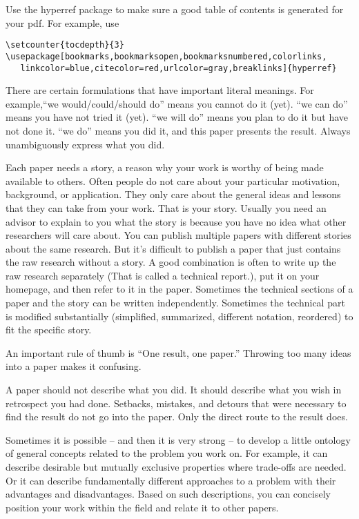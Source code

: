 \documentclass[12pt]{article}
\begin{document}
Use the hyperref package to make sure a good table of contents is generated for your pdf.
For example, use
\begin{verbatim}
\setcounter{tocdepth}{3}
\usepackage[bookmarks,bookmarksopen,bookmarksnumbered,colorlinks,
   linkcolor=blue,citecolor=red,urlcolor=gray,breaklinks]{hyperref}
\end{verbatim}
\medskip

There are certain formulations that have important literal meanings.
For example,``we would/could/should do'' means you cannot do it (yet).
``we can do'' means you have not tried it (yet).
``we will do'' means you plan to do it but have not done it.
``we do'' means you did it, and this paper presents the result.
Always unambiguously express what you did.
\medskip

Each paper needs a story, a reason why your work is worthy of being made available to others.
Often people do not care about your particular motivation, background, or application.
They only care about the general ideas and lessons that they can take from your work. That is your story.
Usually you need an advisor to explain to you what the story is because you have no idea what other researchers will care about.
You can publish multiple papers with different stories about the same research. But it's difficult to publish a paper that just contains the raw research without a story.
A good combination is often to write up the raw research separately (That is called a technical report.), put it on your homepage, and then refer to it in the paper.
Sometimes the technical sections of a paper and the story can be written independently. Sometimes the technical part is modified substantially (simplified, summarized, different notation, reordered) to fit the specific story.
\medskip

An important rule of thumb is ``One result, one paper.''
Throwing too many ideas into a paper makes it confusing.
\medskip

A paper should not describe what you did.
It should describe what you wish in retrospect you had done.
Setbacks, mistakes, and detours that were necessary to find the result do not go into the paper.
Only the direct route to the result does.
\medskip

Sometimes it is possible -- and then it is very strong -- to develop a little ontology of general concepts related to the problem you work on.
For example, it can describe desirable but mutually exclusive properties where trade-offs are needed.
Or it can describe fundamentally different approaches to a problem with their advantages and disadvantages.
Based on such descriptions, you can concisely position your work within the field and relate it to other papers.
\end{document}
